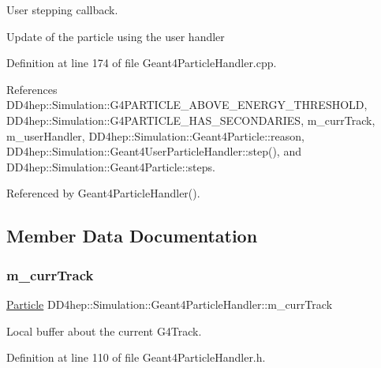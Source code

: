 User stepping callback. 

Update of the particle using the user handler 

Definition at line 174 of file Geant4\+Particle\+Handler.\+cpp.



References D\+D4hep\+::\+Simulation\+::\+G4\+P\+A\+R\+T\+I\+C\+L\+E\+\_\+\+A\+B\+O\+V\+E\+\_\+\+E\+N\+E\+R\+G\+Y\+\_\+\+T\+H\+R\+E\+S\+H\+O\+LD, D\+D4hep\+::\+Simulation\+::\+G4\+P\+A\+R\+T\+I\+C\+L\+E\+\_\+\+H\+A\+S\+\_\+\+S\+E\+C\+O\+N\+D\+A\+R\+I\+ES, m\+\_\+curr\+Track, m\+\_\+user\+Handler, D\+D4hep\+::\+Simulation\+::\+Geant4\+Particle\+::reason, D\+D4hep\+::\+Simulation\+::\+Geant4\+User\+Particle\+Handler\+::step(), and D\+D4hep\+::\+Simulation\+::\+Geant4\+Particle\+::steps.



Referenced by Geant4\+Particle\+Handler().



\subsection{Member Data Documentation}
\hypertarget{class_d_d4hep_1_1_simulation_1_1_geant4_particle_handler_a4b3c0241a36842b2a6048a3e572e9c48}{}\label{class_d_d4hep_1_1_simulation_1_1_geant4_particle_handler_a4b3c0241a36842b2a6048a3e572e9c48} 
\subsubsection{\texorpdfstring{m\+\_\+curr\+Track}{m\_currTrack}}
{\footnotesize\ttfamily \hyperlink{class_d_d4hep_1_1_simulation_1_1_geant4_particle_handler_a69214f487c50f6fd550571f37e715117}{Particle} D\+D4hep\+::\+Simulation\+::\+Geant4\+Particle\+Handler\+::m\+\_\+curr\+Track\hspace{0.3cm}{\ttfamily [protected]}}



Local buffer about the \textquotesingle{}current\textquotesingle{} G4\+Track. 



Definition at line 110 of file Geant4\+Particle\+Handler.\+h.



